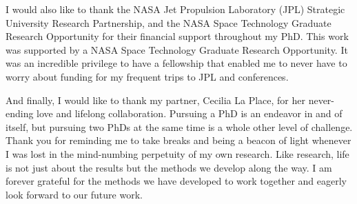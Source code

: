 I would also like to thank the NASA Jet Propulsion Laboratory (JPL) Strategic University Research Partnership, and the NASA Space Technology Graduate Research Opportunity for their financial support throughout my PhD. 
This work was supported by a NASA Space Technology Graduate Research Opportunity. 
It was an incredible privilege to have a fellowship that enabled me to never have to worry about funding for my frequent trips to JPL and conferences.

And finally, I would like to thank my partner, Cecilia La Place, for her never-ending love and lifelong collaboration. 
Pursuing a PhD is an endeavor in and of itself, but pursuing two PhDs at the same time is a whole other level of challenge.
Thank you for reminding me to take breaks and being a beacon of light whenever I was lost in the mind-numbing perpetuity of my own research.
Like research, life is not just about the results but the methods we develop along the way.
I am forever grateful for the methods we have developed to work together and eagerly look forward to our future work.